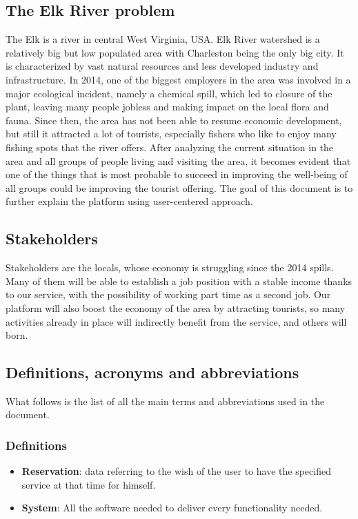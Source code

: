 \subsection{The Elk River problem}
The Elk is a river in central West Virginia, USA. Elk River watershed is a relatively big but low populated area with Charleston being the only big city. It is characterized by vast natural resources and less developed industry and infrastructure. In 2014, one of the biggest employers in the area was involved in a major ecological incident, namely a chemical spill, which led to closure of the plant, leaving many people jobless and making impact on the local flora and fauna. Since then, the area has not been able to resume economic development, but still it attracted a lot of tourists, especially fishers who like to enjoy many fishing spots that the river offers. After analyzing the current situation in the area and all groups of people living and visiting the area, it becomes evident that one of the things that is most probable to succeed in improving the well-being of all groups could be improving the tourist offering. The goal of this document is to further explain the platform using user-centered approach.
\subsection{Stakeholders}
Stakeholders are the locals, whose economy is struggling since the 2014 spills. Many of them will be able to establish a job position with a stable income thanks to our service, with the possibility of working part time as a second job. Our platform will also boost the economy of the area by attracting tourists, so many activities already in place will indirectly benefit from the service, and others will born.
\subsection{Definitions, acronyms and abbreviations}
What follows is the list of all the main terms and abbreviations used in the document.
\subsubsection{Definitions}
\begin{itemize}
\item \textbf{Reservation}: data referring to the wish of the user to have the specified service at that time for himself.
\item \textbf{System}: All the software needed to deliver every functionality needed.
\end{itemize}
